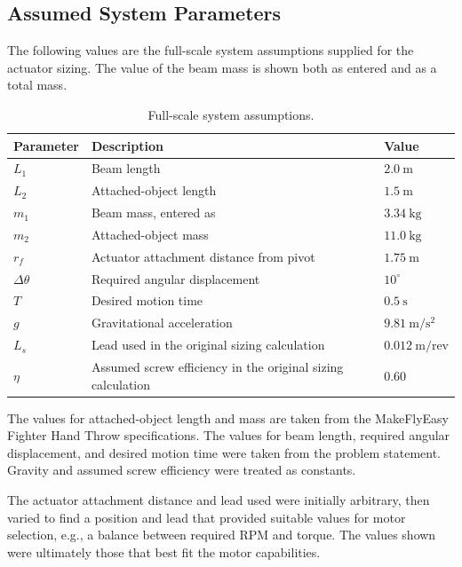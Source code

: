 \documentclass[11pt]{article}
\begin{document}
\subsection{Assumed System Parameters}

The following values are the full-scale system assumptions supplied for the
actuator sizing. The value of the beam mass is shown both as entered and as a
total mass.

\begin{table}[h!]
\centering
\begin{tabularx}{\textwidth}{@{}l Y l@{}}
\toprule
\textbf{Parameter} & \textbf{Description} & \textbf{Value} \\
\midrule
$L_1$ & Beam length & $2.0\ \mathrm{m}$ \\
$L_2$ & Attached-object length & $1.5\ \mathrm{m}$ \\
$m_1$ & Beam mass, entered as & $3.34\ \mathrm{kg}$ \\
$m_2$ & Attached-object mass & $11.0\ \mathrm{kg}$ \\
$r_f$ & Actuator attachment distance from pivot & $1.75\ \mathrm{m}$ \\
$\Delta\theta$ & Required angular displacement & $10^\circ$ \\
$T$ & Desired motion time & $0.5\ \mathrm{s}$ \\
$g$ & Gravitational acceleration & $9.81\ \mathrm{m/s^2}$ \\
$L_s$ & Lead used in the original sizing calculation & $0.012\ \mathrm{m/rev}$ \\
$\eta$ & Assumed screw efficiency in the original sizing calculation & $0.60$ \\
\bottomrule
\end{tabularx}
\caption{Full-scale system assumptions.}
\end{table}

The values for attached-object length and mass are taken from the
MakeFlyEasy Fighter Hand Throw specifications. The values for beam length,
required angular displacement, and desired motion time were taken from the
problem statement. Gravity and assumed screw efficiency were treated as
constants.

The actuator attachment distance and lead used were initially arbitrary,
then varied to find a position and lead that provided suitable values for
motor selection, e.g., a balance between required RPM and torque. The values
shown were ultimately those that best fit the motor capabilities.
\end{document}
